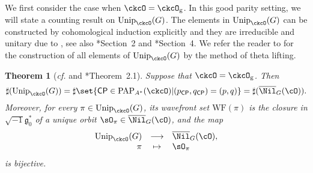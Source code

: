 \documentclass[12pt]{amsart}
\newcommand{\trivial}[2][]{\if\relax\detokenize{#1}\relax
  {%
      \color{orange} \vspace{0em}$[$#2$]$
      \color{black}
  }
  \else
\ifx#1h
\ifcsname showtrivial\endcsname
{%
    \color{orange}\vspace{0em}$[$#2$]$
    \color{black}
}
\fi
\else {\red Wrong argument!} \fi
\fi
}
\newcommand{\WF}{\mathrm{WF}}
\newcommand{\CP}{{\mathcal {P}}}
\newcommand{\g}{\mathfrak g}
\numberwithin{equation}{section}
\newtheorem{thm}{Theorem}[section]
\theoremstyle{remark}
\def\cf{\emph{cf.} }
\def\Unip{\mathrm{Unip}}
\def\CP{\mathsf{CP}}
\def\Cint#1{\Coh_{[#1]}}
\def\Coh{\mathrm{Coh}}
\begin{document}
We first consider the case when  $\ckcO = \ckcO_{\mathrm g}$.
In this good parity setting, we will state a counting result on
$\Unip_{\ckcO}(G)$. The elements in $\Unip_{\ckcO}(G)$ can be constructed by
cohomological induction explicitly and they are irreducible and unitary due to
\cite{Mat96,Tr.U}, see also \cite{Tr.H}*{Section~2} and \cite{MR.U}*{Section~4}.
We refer the reader to \cite{BMSZ2} for the construction of all elements of $\Unip_{\ckcO}(G)$ by the method of theta lifting.


\begin{thm}[\cf {\cite[Theorem 4.2]{BV.W} and \cite{Tr.H}*{Theorem~2.1}}]\label{thmunit0}
  Suppose that $\ckcO = \ckcO_{\mathrm g}$. Then
  \begin{equation} \label{sharpuni0} \sharp(\Unip_{\ckcO}(G))= \sharp \set{\CP\in \mathrm{PAP}_{A^*}(\ckcO)|(p_\CP, q_\CP)=(p,q)}=\sharp(\overline \Nil_{G}(\cO)).
  \end{equation}
  Moreover, for every $\pi\in \Unip_{\ckcO}(G)$, its wavefront set $\WF(\pi)$ is
  the closure in $\sqrt{-1}\g_0^*$ of a unique orbit
  $\sO_\pi\in \overline \Nil_{G}(\cO)$, and the map
  \begin{equation}\label{sharpuni1}
    \begin{array}{rcl}
      \Unip_{\ckcO}(G) &\longrightarrow& \overline \Nil_{G}(\cO), \\%
      \pi & \mapsto & \sO_\pi
    \end{array}
  \end{equation}
  is bijective.
\end{thm}
\end{document}

